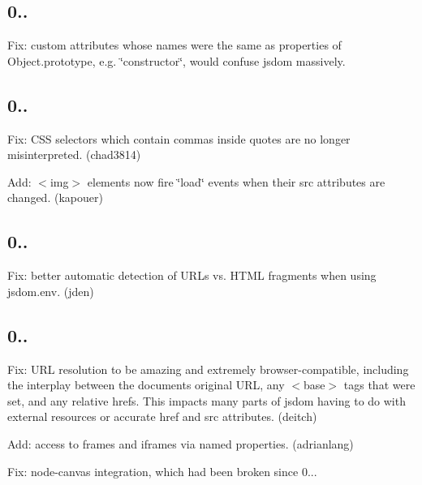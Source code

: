 \subsection*{0..}


\begin{DoxyItemize}
\item Fix\+: custom attributes whose names were the same as properties of {\ttfamily Object.\+prototype}, e.\+g. {\ttfamily \char`\"{}constructor\char`\"{}}, would confuse jsdom massively.
\end{DoxyItemize}

\subsection*{0..}


\begin{DoxyItemize}
\item Fix\+: C\+SS selectors which contain commas inside quotes are no longer misinterpreted. (chad3814)
\item Add\+: {\ttfamily $<$img$>$} elements now fire {\ttfamily \char`\"{}load\char`\"{}} events when their {\ttfamily src} attributes are changed. (kapouer)
\end{DoxyItemize}

\subsection*{0..}


\begin{DoxyItemize}
\item Fix\+: better automatic detection of U\+R\+Ls vs. H\+T\+ML fragments when using {\ttfamily jsdom.\+env}. (jden)
\end{DoxyItemize}

\subsection*{0..}


\begin{DoxyItemize}
\item Fix\+: U\+RL resolution to be amazing and extremely browser-\/compatible, including the interplay between the document\textquotesingle{}s original U\+RL, any {\ttfamily $<$base$>$} tags that were set, and any relative {\ttfamily href}s. This impacts many parts of jsdom having to do with external resources or accurate {\ttfamily href} and {\ttfamily src} attributes. (deitch)
\item Add\+: access to frames and iframes via named properties. (adrianlang)
\item Fix\+: node-\/canvas integration, which had been broken since 0...
\end{DoxyItemize}

